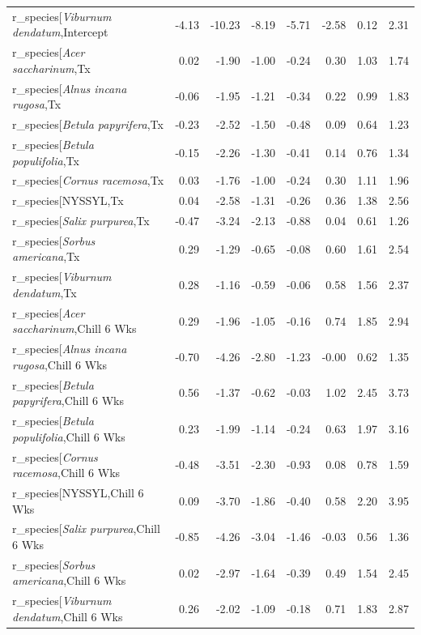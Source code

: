 \documentclass{article}\usepackage[]{graphicx}\usepackage[]{color}
\begin{document}
\begin{longtable}{lrrrrrrr}
  r_species[\textit{Viburnum dendatum},Intercept & -4.13 & -10.23 & -8.19 & -5.71 & -2.58 & 0.12 & 2.31 \\ 
  r_species[\textit{Acer saccharinum},Tx & 0.02 & -1.90 & -1.00 & -0.24 & 0.30 & 1.03 & 1.74 \\ 
  r_species[\textit{Alnus incana rugosa},Tx & -0.06 & -1.95 & -1.21 & -0.34 & 0.22 & 0.99 & 1.83 \\ 
  r_species[\textit{Betula papyrifera},Tx & -0.23 & -2.52 & -1.50 & -0.48 & 0.09 & 0.64 & 1.23 \\ 
  r_species[\textit{Betula populifolia},Tx & -0.15 & -2.26 & -1.30 & -0.41 & 0.14 & 0.76 & 1.34 \\ 
  r_species[\textit{Cornus racemosa},Tx & 0.03 & -1.76 & -1.00 & -0.24 & 0.30 & 1.11 & 1.96 \\ 
  r_species[NYSSYL,Tx & 0.04 & -2.58 & -1.31 & -0.26 & 0.36 & 1.38 & 2.56 \\ 
  r_species[\textit{Salix purpurea},Tx & -0.47 & -3.24 & -2.13 & -0.88 & 0.04 & 0.61 & 1.26 \\ 
  r_species[\textit{Sorbus americana},Tx & 0.29 & -1.29 & -0.65 & -0.08 & 0.60 & 1.61 & 2.54 \\ 
  r_species[\textit{Viburnum dendatum},Tx & 0.28 & -1.16 & -0.59 & -0.06 & 0.58 & 1.56 & 2.37 \\ 
  r_species[\textit{Acer saccharinum},Chill 6 Wks & 0.29 & -1.96 & -1.05 & -0.16 & 0.74 & 1.85 & 2.94 \\ 
  r_species[\textit{Alnus incana rugosa},Chill 6 Wks & -0.70 & -4.26 & -2.80 & -1.23 & -0.00 & 0.62 & 1.35 \\ 
  r_species[\textit{Betula papyrifera},Chill 6 Wks & 0.56 & -1.37 & -0.62 & -0.03 & 1.02 & 2.45 & 3.73 \\ 
  r_species[\textit{Betula populifolia},Chill 6 Wks & 0.23 & -1.99 & -1.14 & -0.24 & 0.63 & 1.97 & 3.16 \\ 
  r_species[\textit{Cornus racemosa},Chill 6 Wks & -0.48 & -3.51 & -2.30 & -0.93 & 0.08 & 0.78 & 1.59 \\ 
  r_species[NYSSYL,Chill 6 Wks & 0.09 & -3.70 & -1.86 & -0.40 & 0.58 & 2.20 & 3.95 \\ 
  r_species[\textit{Salix purpurea},Chill 6 Wks & -0.85 & -4.26 & -3.04 & -1.46 & -0.03 & 0.56 & 1.36 \\ 
  r_species[\textit{Sorbus americana},Chill 6 Wks & 0.02 & -2.97 & -1.64 & -0.39 & 0.49 & 1.54 & 2.45 \\ 
  r_species[\textit{Viburnum dendatum},Chill 6 Wks & 0.26 & -2.02 & -1.09 & -0.18 & 0.71 & 1.83 & 2.87 \\ 

\end{longtable}
\end{document}
